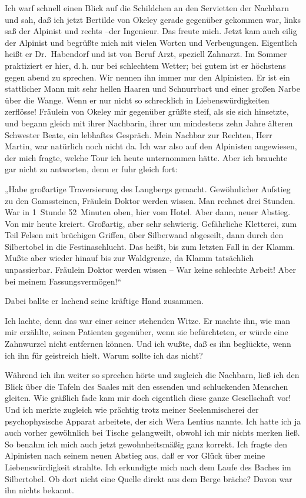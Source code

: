 Ich warf schnell einen Blick auf die Schildchen an den Servietten
der Nachbarn und sah, daß ich jetzt Bertilde von Okeley gerade
gegenüber gekommen war, links saß der Alpinist und rechts –der
Ingenieur. Das freute mich. Jetzt kam auch eilig der Alpinist und
begrüßte mich mit vielen Worten und Verbeugungen. Eigentlich heißt
er Dr.~Habendorf und ist von Beruf Arzt, speziell Zahnarzt. Im
Sommer praktiziert er hier, d.\,h. nur bei schlechtem Wetter; bei
gutem ist er höchstens gegen abend zu sprechen. Wir nennen ihn
immer nur den Alpinisten. Er ist ein stattlicher Mann mit sehr
hellen Haaren und Schnurrbart und einer großen Narbe über die
Wange. Wenn er nur nicht so schrecklich in Liebenswürdigkeiten
zerflösse! Fräulein von Okeley mir gegenüber grüßte steif, als sie
sich hinsetzte, und begann gleich mit ihrer Nachbarin, ihrer um
mindestens zehn Jahre älteren Schwester Beate, ein lebhaftes
Gespräch. Mein Nachbar zur Rechten, Herr Martin, war natürlich noch
nicht da. Ich war also auf den Alpinisten angewiesen, der mich
fragte, welche Tour ich heute unternommen hätte. Aber ich brauchte
gar nicht zu antworten, denn er fuhr gleich fort:

„Habe großartige Traversierung des Langbergs gemacht. Gewöhnlicher
Aufstieg zu den Gamssteinen, Fräulein Doktor werden wissen. Man
rechnet drei Stunden. War in 1~Stunde 52~Minuten oben, hier vom
Hotel. Aber dann, neuer Abstieg. Von mir heute kreiert. Großartig,
aber sehr schwierig. Gefährliche Kletterei, zum Teil Felsen mit
brüchigen Griffen, über Silberwand abgeseilt, dann durch den
Silbertobel in die Festinaschlucht. Das heißt, bis zum letzten Fall
in der Klamm. Mußte aber wieder hinauf bis zur Waldgrenze, da Klamm
tatsächlich unpassierbar. Fräulein Doktor werden wissen – War keine
schlechte Arbeit! Aber bei meinem Fassungsvermögen!“

Dabei ballte er lachend seine kräftige Hand zusammen.

Ich lachte, denn das war einer seiner stehenden Witze. Er machte
ihn, wie man mir erzählte, seinen Patienten gegenüber, wenn sie
befürchteten, er würde eine Zahnwurzel nicht entfernen können. Und
ich wußte, daß es ihn beglückte, wenn ich ihn für geistreich hielt.
Warum sollte ich das nicht?

Während ich ihn weiter so sprechen hörte und zugleich die Nachbarn,
ließ ich den Blick über die Tafeln des Saales mit den essenden und
schluckenden Menschen gleiten. Wie gräßlich fade kam mir doch
eigentlich diese ganze Gesellschaft vor! Und ich merkte zugleich
wie prächtig trotz meiner Seelenmischerei der psychophysische
Apparat arbeitete, der sich Wera Lentius nannte. Ich hatte ich ja
auch vorher gewöhnlich bei Tische gelangweilt, obwohl ich mir
nichts merken ließ. So benahm ich mich auch jetzt gewohnheitsmäßig
ganz korrekt. Ich fragte den Alpinisten nach seinem neuen Abstieg
aus, daß er vor Glück über meine Liebenswürdigkeit strahlte. Ich
erkundigte mich nach dem Laufe des Baches im Silbertobel. Ob dort
nicht eine Quelle direkt aus dem Berge bräche? Davon war ihn nichts
bekannt.

